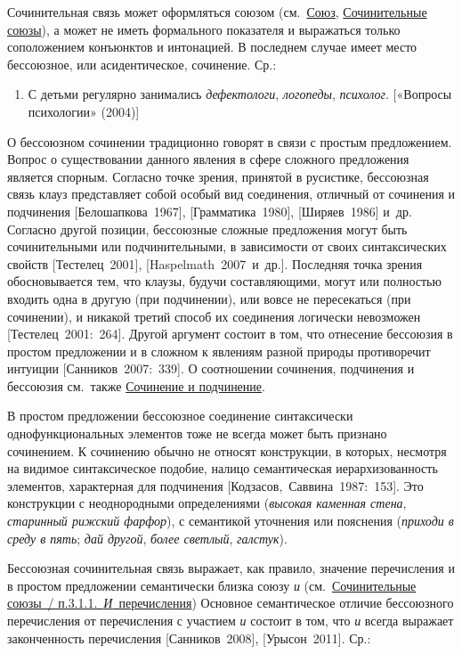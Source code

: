 Сочинительная связь может оформляться союзом (см.~\underline{Союз},
\underline{Сочинительные союзы}), а может не иметь формального
показателя и выражаться только соположением конъюнктов и интонацией. В
последнем случае имеет место бессоюзное, или асидентическое, сочинение.
Ср.:

\begin{enumerate}
\def\labelenumi{(\arabic{enumi})}
\setcounter{enumi}{64}
\item
  С детьми регулярно занимались \emph{дефектологи}, \emph{логопеды},
  \emph{психолог}. {[}«Вопросы психологии» (2004){]}
\end{enumerate}

О бессоюзном сочинении традиционно говорят в связи с простым
предложением. Вопрос о существовании данного явления в сфере сложного
предложения является спорным. Согласно точке зрения, принятой в
русистике, бессоюзная связь клауз представляет собой особый вид
соединения, отличный от сочинения и подчинения {[}Белошапкова~1967{]},
{[}Грамматика~1980{]}, {[}Ширяев~1986{]} и~др. Согласно другой позиции,
бессоюзные сложные предложения могут быть сочинительными или
подчинительными, в зависимости от своих синтаксических свойств
{[}Тестелец~2001{]}, {[}Haspelmath~2007~и~др.{]}. Последняя точка зрения
обосновывается тем, что клаузы, будучи составляющими, могут или
полностью входить одна в другую (при подчинении), или вовсе не
пересекаться (при сочинении), и никакой третий способ их соединения
логически невозможен {[}Тестелец~2001:~264{]}. Другой аргумент состоит в
том, что отнесение бессоюзия в простом предложении и в сложном к
явлениям разной природы противоречит интуиции {[}Санников~2007:~339{]}.
О соотношении сочинения, подчинения и бессоюзия см.~также
\underline{Сочинение и подчинение}.

В простом предложении бессоюзное соединение синтаксически
однофункциональных элементов тоже не всегда может быть признано
сочинением. К сочинению обычно не относят конструкции, в которых,
несмотря на видимое синтаксическое подобие, налицо семантическая
иерархизованность элементов, характерная для подчинения
{[}Кодзасов,~Саввина~1987:~153{]}. Это конструкции с неоднородными
определениями (\emph{высокая каменная стена}, \emph{старинный рижский
фарфор}), с семантикой уточнения или пояснения (\emph{приходи в среду в
пять}; \emph{дай другой}, \emph{более светлый}, \emph{галстук}).

Бессоюзная сочинительная связь выражает, как правило, значение
перечисления и в простом предложении семантически близка союзу \emph{и}
(см.~\underline{Сочинительные союзы~/ п.3.1.1.~\emph{И}~перечисления})
Основное семантическое отличие бессоюзного перечисления от перечисления
с участием \emph{и} состоит в том, что \emph{и} всегда выражает
законченность перечисления {[}Санников~2008{]}, {[}Урысон~2011{]}. Ср.:

